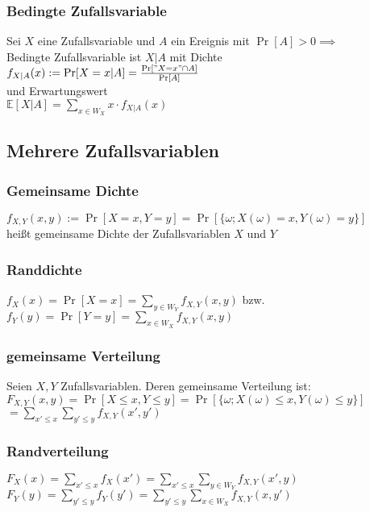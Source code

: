 \documentclass[a4paper,9pt]{extarticle}
\begin{document}
\subsubsection*{Bedingte Zufallsvariable}
Sei $X$ eine Zufallsvariable und $A$ ein Ereignis mit $\Pr[A] > 0 \implies$ \\
Bedingte Zufallsvariable ist $X|A$ mit Dichte \\
$f_{X|A}(x) := \Pr[X = x | A] = \frac{\Pr["X = x" \cap A]}{\Pr[A]}$ \\
und Erwartungswert \\
$\mathbb{E}[X|A] = \sum_{x \in W_X} x ⋅ f_{X|A}(x)$ \\

\subsection*{Mehrere Zufallsvariablen}
\subsubsection*{Gemeinsame Dichte}
$f_{X,Y}(x,y) := \Pr[X = x, Y = y] = \Pr[\{\omega; X(\omega) = x, Y(\omega) = y\}]$ \\
heißt gemeinsame Dichte der Zufallsvariablen $X$ und $Y$

\subsubsection*{Randdichte}
$f_X(x) = \Pr[X = x] = \sum_{y \in W_Y} f_{X,Y}(x,y)$ bzw. \\
$f_Y(y) = \Pr[Y = y] = \sum_{x \in W_X} f_{X,Y}(x,y)$ \\

\subsubsection*{gemeinsame Verteilung}
Seien $X, Y$ Zufallsvariablen. Deren gemeinsame Verteilung ist: \\
$F_{X,Y}(x,y) = \Pr[X ≤ x, Y ≤ y] = \Pr[\{\omega; X(\omega) ≤ x, Y(\omega) ≤ y\}]$ \\
$= \sum_{x' ≤ x} \sum_{y' ≤ y} f_{X,Y} (x',y')$

\subsubsection*{Randverteilung}
$F_X(x) = \sum_{x' ≤ x} f_X(x') = \sum_{x' ≤ x} \sum_{y \in W_Y} f_{X,Y} (x',y)$ \\
$F_Y(y) = \sum_{y' ≤ y} f_Y(y') = \sum_{y' ≤ y} \sum_{x \in W_X} f_{X,Y} (x,y')$
\end{document}
